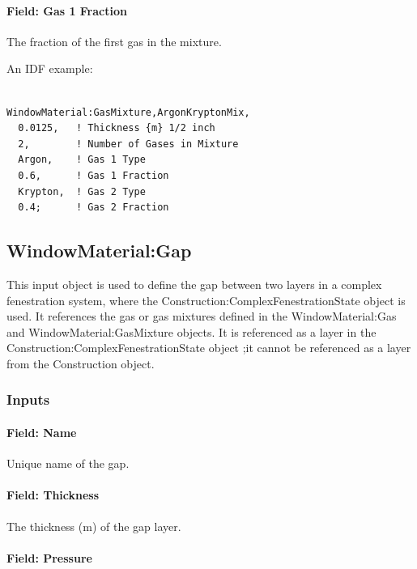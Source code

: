 \paragraph{Field: Gas 1 Fraction}\label{field-gas-1-fraction}

The fraction of the first gas in the mixture.

An IDF example:

\begin{lstlisting}

WindowMaterial:GasMixture,ArgonKryptonMix,
  0.0125,   ! Thickness {m} 1/2 inch
  2,        ! Number of Gases in Mixture
  Argon,    ! Gas 1 Type
  0.6,      ! Gas 1 Fraction
  Krypton,  ! Gas 2 Type
  0.4;      ! Gas 2 Fraction
\end{lstlisting}

\subsection{WindowMaterial:Gap}\label{windowmaterialgap}

This input object is used to define the gap between two layers in a complex fenestration system, where the Construction:ComplexFenestrationState object is used. It references the gas or gas mixtures defined in the WindowMaterial:Gas and WindowMaterial:GasMixture objects. It is referenced as a layer in the Construction:ComplexFenestrationState object ;it cannot be referenced as a layer from the Construction object.

\subsubsection{Inputs}\label{inputs-18-009}

\paragraph{Field: Name}\label{field-name-12-011}

Unique name of the gap.

\paragraph{Field: Thickness}\label{field-thickness-5}

The thickness (m) of the gap layer.

\paragraph{Field: Pressure}\label{field-pressure-000}

